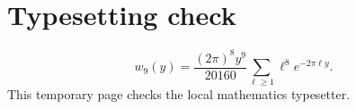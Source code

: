 \documentclass[11pt]{article}
\begin{document}
\section*{Typesetting check}
\[
 w_9(y)=\frac{(2\pi)^8y^9}{20160}
 \sum_{\ell\ge1}\ell^8e^{-2\pi\ell y}.
\]
This temporary page checks the local mathematics typesetter.
\end{document}
